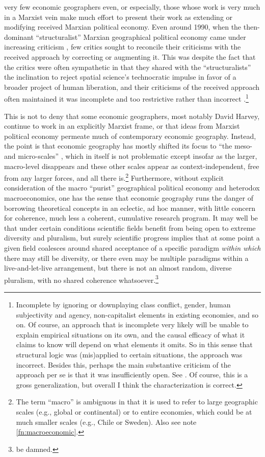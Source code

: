 very few economic geographers \textendash{} even, or especially, those
whose work is very much in a Marxist vein \textendash{} make much
effort to present their work as extending or modifying received Marxian
political economy. Even around 1990, when the then-dominant ``structuralist''
Marxian geographical political economy came under increasing criticism
\citep{scott07economic}, few critics sought to reconcile their criticisms
with the received approach by correcting or augmenting it. This was
despite the fact that the critics were often sympathetic in that they
shared with the ``structuralists'' the inclination to reject spatial
science's technocratic impulse in favor of a broader project of human
liberation, and their criticisms of the received approach often maintained
it was incomplete and too restrictive rather than incorrect .\footnote{Incomplete by ignoring or downplaying class conflict, gender, human
subjectivity and agency, non-capitalist elements in existing economies,
and so on. Of course, an approach that is incomplete very likely will
be unable to explain empirical situations on its own, and the causal
efficacy of what it claims to know will depend on what elements it
omits. So in this sense that structural logic was (mis)applied to
certain situations, the approach was incorrect. Besides this, perhaps
the main substantive criticism of the approach per se is that it was
insufficiently open. See \citet[490 - 491]{scott07economic}. Of course,
this is a gross generalization, but overall I think the characterization
is correct.}

This is not to deny that some economic geographers, most notably David
Harvey, continue to work in an explicitly Marxist frame, or that ideas
from Marxist political economy permeate much of contemporary economic
geography. Instead, the point is that economic geography has mostly
shifted its focus to ``the meso- and micro-scales'' \citep[700]{jones2016geographies},
which in itself is not problematic except insofar as the larger, macro-level
disappears and these other scales appear as context-independent, free
from any larger forces, and all there is.\footnote{The term ``macro'' is ambiguous in that it is used to refer to large
geographic scales (e.g., global or continental) or to entire economies,
which could be at much smaller scales (e.g., Chile or Sweden). Also
see note \ref{fn:macroeconomic}.} Furthermore, without explicit consideration of the macro ``purist''
geographical political economy and heterodox macroeconomics, one has
the sense that economic geography runs the danger of borrowing theoretical
concepts in an eclectic, ad hoc manner, with little concern for coherence,
much less a coherent, cumulative research program. It may well be
that under certain conditions scientific fields benefit from being
open to extreme diversity and pluralism, but surely scientific progress
implies that at some point a given field coalesces around shared acceptance
of a specific paradigm \emph{within which} there may still be diversity,
or there even may be multiple paradigms within a live-and-let-live
arrangement, but there is not an almost random, diverse pluralism,
with no shared coherence whatsoever.\footnote{\citet{feyerabend1993against} be damned.}

